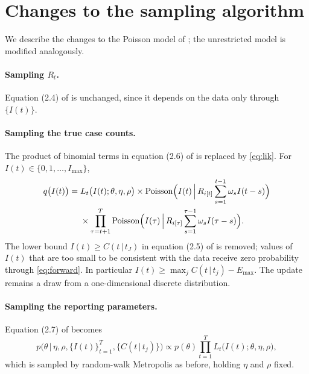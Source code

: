 \documentclass[11pt,a4paper]{article}
\newcommand{\given}{\,|\,}
\newcommand{\pois}{\operatorname{Poisson}}
\newcommand{\Emax}{E_{\max}}
\newcommand{\Imax}{I_{\max}}
\begin{document}
\section{Changes to the sampling algorithm}

We describe the changes to the Poisson model of \cite{bajaj2025}; the
unrestricted model is modified analogously.

\paragraph{Sampling $R_t$.} Equation (2.4) of \cite{bajaj2025} is unchanged,
since it depends on the data only through $\{I(t)\}$.

\paragraph{Sampling the true case counts.} The product of binomial terms in
equation (2.6) of \cite{bajaj2025} is replaced by \eqref{eq:lik}. For
$I(t)\in\{0,1,\dots,\Imax\}$,
\begin{equation}
\begin{aligned}
q\bigl(I(t)\bigr) ={}& L_t\bigl(I(t);\theta,\eta,\rho\bigr)
\times \pois\Bigl(I(t)\,\Big|\, R_{i[t]}\sum_{s=1}^{t-1}\omega_s I(t-s)\Bigr) \\
&\times \prod_{\tau=t+1}^{T}\pois\Bigl(I(\tau)\,\Big|\, R_{i[\tau]}\sum_{s=1}^{\tau-1}\omega_s I(\tau-s)\Bigr).
\end{aligned}
\end{equation}
The lower bound $I(t)\ge C(t\given t_J)$ in equation (2.5) of \cite{bajaj2025}
is removed; values of $I(t)$ that are too small to be consistent with the data
receive zero probability through \eqref{eq:forward}. In particular
$I(t)\ge\max_j C(t\given t_j)-\Emax$. The update remains a draw
from a one-dimensional discrete distribution.

\paragraph{Sampling the reporting parameters.} Equation (2.7) of
\cite{bajaj2025} becomes
\begin{equation}\label{eq:theta}
p\bigl(\theta \,\big|\, \eta,\rho,\{I(t)\}_{t=1}^{T},\{C(t\given t_j)\}\bigr)
\propto p(\theta)\prod_{t=1}^{T}L_t\bigl(I(t);\theta,\eta,\rho\bigr),
\end{equation}
which is sampled by random-walk Metropolis as before, holding $\eta$ and $\rho$
fixed.
\end{document}
